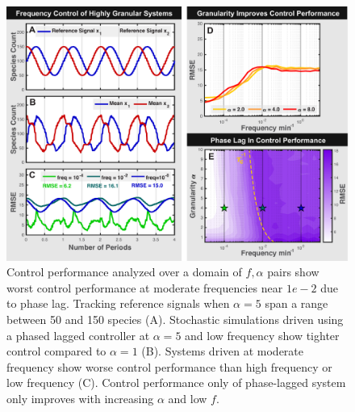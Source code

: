 \documentclass[12pt]{iopart}
\begin{document}
\begin{figure}
\begin{center}
\includegraphics[width=1\textwidth]{Frequency.pdf}
\vspace{-0.1in}
\caption{Control performance analyzed over a domain of $f,\alpha$ pairs show worst control performance at moderate frequencies near $1e-2$ due to phase lag. Tracking reference signals when $\alpha=5$ span a range between 50 and 150 species (A). Stochastic simulations driven using a phased lagged controller at $\alpha = 5$ and low frequency show tighter control compared to $\alpha =1$ (B). Systems driven at moderate frequency show worse control performance than high frequency or low frequency (C). Control performance only of phase-lagged system only improves with increasing $\alpha$ and low $f$.}
\label{CRG}
\end{center}
\vspace{-0.2in}
\end{figure}
\end{document}
